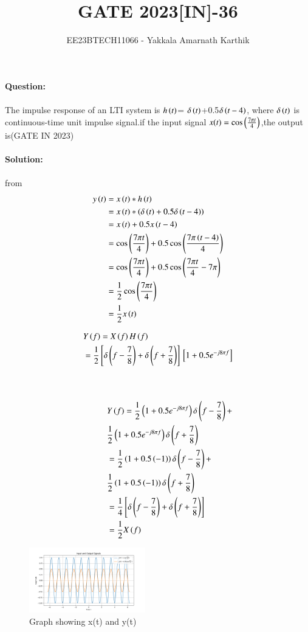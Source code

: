 \documentclass[journal,12pt,twocolumn]{IEEEtran}
\begin{document}


\title{GATE 2023[IN]-36}
\author{EE23BTECH11066 - Yakkala Amarnath Karthik}
\maketitle

\textbf{Question:}\\ \\
The impulse response of an LTI system is $h\left(t\right)$= $\delta\left(t\right)$+0.5$ \delta\left(t-4\right)$, where $\delta\left(t\right)$ is continuous-time unit impulse signal.if the input signal $x(t)=\cos\left(\frac{7\pi t}{4}\right)$,the output is\hfill(GATE IN 2023)\\ \\

\textbf{Solution:}\\
\\
 from 
\begin{align}
    y\left(t\right) &=x\left(t\right) * h\left(t\right)\\
            &=x\left(t\right) * \left(\delta\left(t\right)+0.5 \delta\left(t-4\right)\right)\\
            &=x\left(t\right)+0.5x\left(t-4\right)\\
            &=\cos\left(\frac{7\pi t}{4}\right)+0.5\cos\left(\frac{7\pi \left(t-4\right)}{4}\right)\\
            &=\cos\left(\frac{7\pi t}{4}\right)+0.5\cos\left(\frac{7\pi t}{4}-7\pi\right)\\
            &=\frac{1}{2}\cos\left(\frac{7\pi t}{4}\right)\\
            &=\frac{1}{2}x\left(t\right)
\end{align}

\begin{align}
    &Y\left(f\right) = X\left(f\right)H\left(f\right)\\
   &=\frac{1}{2}{}\left[\delta \left(f-\frac{7}{8}\right)+\delta \left(f+\frac{7}{8}\right)\right]{}\left[1+0.5e^{-j8\pi f}\right]
         \end{align} \\ \\
 \vspace{7.2cm}
\begin{align}
  \hspace{1cm}&Y\left(f\right) =\frac{1}{2}\left(1+0.5e^{-j8\pi f}\right)\delta \left(f-\frac{7}{8}\right)+\nonumber\\
   &\frac{1}{2}\left(1+0.5e^{-j8\pi f}\right)\delta \left(f+\frac{7}{8}\right)\\
   &=\frac{1}{2}\left(1+0.5\left(-1\right)\right)\delta \left(f-\frac{7}{8}\right)+\nonumber\\
   &\frac{1}{2}\left(1+0.5\left(-1\right)\right)\delta \left(f+\frac{7}{8}\right)\\
  &=\frac{1}{4}{}\left[\delta \left(f-\frac{7}{8}\right)+\delta \left(f+\frac{7}{8}\right)\right]\\
   &=\frac{1}{2}X\left(f\right)
\end{align}

\begin{figure}[ht]
    \centering
    \includegraphics[width=0.45\textwidth]{figs/pythongate.png}
    \caption{Graph showing x(t) and y(t)}
\end{figure}
\end{document}
